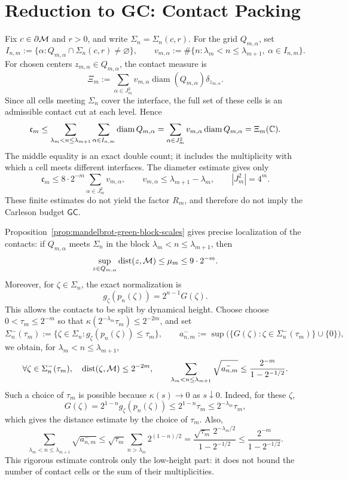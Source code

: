 \section{Reduction to GC: Contact Packing}
\label{sec:gc-open-reductions}

Fix \(c\in\partial\mathcal M\) and \(r>0\), and write
$\Sigma_n=\Sigma_n(c,r)$.
For the grid \(Q_{m,\alpha}\), set
\[
 I_{n,m}:=\{\alpha:Q_{m,\alpha}\cap\Sigma_n(c,r)\ne\varnothing\},\qquad
 v_{m,\alpha}:=\#\{n:\lambda_m<n\le\lambda_{m+1},\
                         \alpha\in I_{n,m}\}.
\]
For chosen centers \(z_{m,\alpha}\in Q_{m,\alpha}\), the contact
measure is
\[
 \Xi_m:=\sum_{\alpha\in J_m^2}
 v_{m,\alpha}\operatorname{diam}(Q_{m,\alpha})\delta_{z_{m,\alpha}}.
\]
Since all cells meeting \(\Sigma_n\) cover the interface, the full set
of these cells is an admissible contact cut at each level. Hence
\begin{equation}
 \mathfrak c_m\le
 \sum_{\lambda_m<n\le\lambda_{m+1}}
       \sum_{\alpha\in I_{n,m}}\operatorname{diam}Q_{m,\alpha}
 =\sum_{\alpha\in J_m^2}
       v_{m,\alpha}\operatorname{diam}Q_{m,\alpha}
 =\Xi_m(\mathbb C).
 \label{eq:gc-mass-reduction}
\end{equation}
The middle equality is an exact double count; it includes the
multiplicity with which a cell meets different interfaces. The
diameter estimate gives only
\[
 \mathfrak c_m\le8\cdot2^{-m}\sum_{\alpha\in J_m^2}v_{m,\alpha},
 \qquad v_{m,\alpha}\le\lambda_{m+1}-\lambda_m,
 \qquad |J_m^2|=4^m.
\]
These finite estimates do not yield the factor \(R_m\), and therefore
do not imply the Carleson budget \(\mathsf{GC}\).

Proposition~\ref{prop:mandelbrot-green-block-scales} gives precise
localization of the contacts: if \(Q_{m,\alpha}\) meets \(\Sigma_n\) in
the block \(\lambda_m<n\le\lambda_{m+1}\), then
\[
 \sup_{z\in Q_{m,\alpha}}\operatorname{dist}(z,\mathcal M)\le\mu_m\le9\cdot2^{-m}.
\]
Moreover, for \(\zeta\in\Sigma_n\), the exact normalization is
\[
 g_\zeta(p_n(\zeta))=2^{n-1}G(\zeta).
\]
This allows the contacts to be split by dynamical height. Choose
choose \(0<\tau_m\le2^{-m}\) so that
\(\kappa(2^{-\lambda_m}\tau_m)\le2^{-2m}\), and set
\[
 \Sigma_n^-(\tau_m):=
 \{\zeta\in\Sigma_n:g_\zeta(p_n(\zeta))\le\tau_m\},
 \qquad
 a_{n,m}^-:=\sup\bigl(\{G(\zeta):\zeta\in\Sigma_n^-(\tau_m)\}\cup\{0\}\bigr),
\]
we obtain, for \(\lambda_m<n\le\lambda_{m+1}\),
\begin{equation}
 \forall\zeta\in\Sigma_n^-(\tau_m),\quad
 \operatorname{dist}(\zeta,\mathcal M)\le2^{-2m},\qquad
 \sum_{\lambda_m<n\le\lambda_{m+1}}\sqrt{a_{n,m}^-}
 \le\frac{2^{-m}}{1-2^{-1/2}}.
 \label{eq:gc-low-height-budget}
\end{equation}
Such a choice of \(\tau_m\) is possible because
\(\kappa(s)\to0\) as \(s\downarrow0\). Indeed, for these \(\zeta\),
\[
 G(\zeta)=2^{1-n}g_\zeta(p_n(\zeta))
 \le2^{1-n}\tau_m\le2^{-\lambda_m}\tau_m,
\]
which gives the distance estimate by the choice of \(\tau_m\). Also,
\[
 \sum_{\lambda_m<n\le\lambda_{m+1}}\sqrt{a_{n,m}^-}
 \le\sqrt{\tau_m}\sum_{n>\lambda_m}2^{(1-n)/2}
 =\frac{\sqrt{\tau_m}\,2^{-\lambda_m/2}}{1-2^{-1/2}}
 \le\frac{2^{-m}}{1-2^{-1/2}}.
\]
This rigorous estimate controls only the low-height part: it does not
bound the number of contact cells or the sum of their multiplicities.

